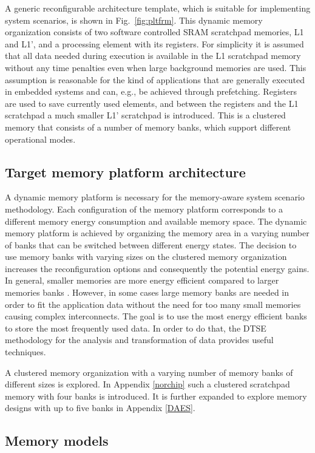 A generic reconfigurable architecture template, which is suitable for implementing system scenarios, is shown in Fig.~\ref{fig:pltfrm}. 
This dynamic memory organization consists of two software controlled SRAM scratchpad memories, L1 and L1', and a processing element with its registers. 
For simplicity it is assumed that all data needed during execution is available in the L1 scratchpad memory without any time penalties even when large background memories are used. 
This assumption is reasonable for the kind of applications that are generally executed in embedded systems and can, e.g., be achieved through prefetching. 
Registers are used to save currently used elements, and between the registers and the L1 scratchpad a much smaller L1' scratchpad is introduced. 
This is a clustered memory that consists of a number of memory banks, which support different operational modes.

\subsection{Target memory platform architecture}

A dynamic memory platform is necessary for the memory-aware system scenario methodology. 
Each configuration of the memory platform corresponds to a different memory energy consumption and available memory space. 
The dynamic memory platform is achieved by organizing the memory area in a varying number of banks that can be switched between different energy states. 
The decision to use memory banks with varying sizes on the clustered memory organization increases the reconfiguration options and consequently the potential energy gains. 
In general, smaller memories are more energy efficient compared to larger memories banks \cite{steinke2002assigning}. 
However, in some cases large memory banks are needed in order to fit the application data without the need for too many small memories causing complex interconnects. 
The goal is to use the most energy efficient banks to store the most frequently used data. 
In order to do that, the DTSE methodology for the analysis and transformation of data provides useful techniques.

A clustered memory organization with a varying number of memory banks of different sizes is explored.
In  Appendix \ref{norchip} such a clustered scratchpad memory with four banks is introduced. 
It is further expanded to explore memory designs with up to five banks in Appendix \ref{DAES}.

\subsection{Memory models}

